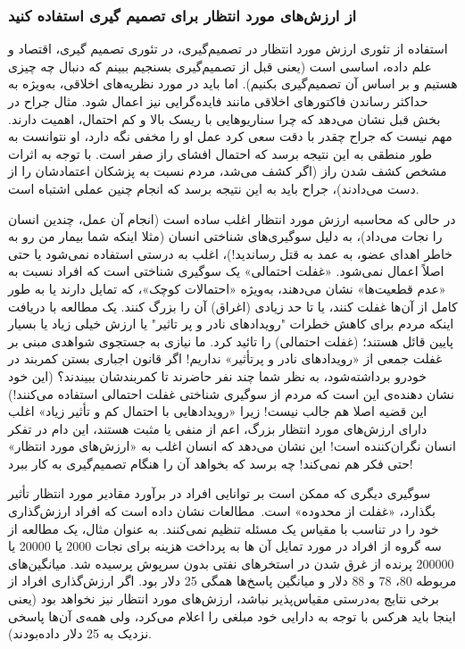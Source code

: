 \subsubsection*{از ارزش‌های مورد انتظار برای تصمیم گیری استفاده کنید}
\label{subsubsec:از ارزش‌های مورد انتظار برای تصمیم گیری استفاده کنید}
استفاده از تئوری ارزش مورد انتظار در تصمیم‌گیری، در تئوری تصمیم گیری، اقتصاد و علم داده، اساسی است (یعنی قبل از تصمیم‌گیری بسنجیم ببینم که دنبال چه چیزی هستیم و بر اساس آن تصمیم‌گیری بکنیم).
اما باید در مورد نظریه‌های اخلاقی، به‌ویژه به حداکثر رساندن فاکتورهای اخلاقی مانند فایده‌گرایی نیز اعمال شود.
مثال جراح در بخش قبل نشان می‌دهد که چرا سناریوهایی با ریسک بالا و کم احتمال، اهمیت دارند.
مهم نیست که جراح چقدر با دقت سعی کرد عمل او را مخفی نگه دارد، او نتوانست به طور منطقی به این نتیجه برسد که احتمال افشای راز صفر است.
با توجه به اثرات مشخص کشف شدن راز (اگر کشف می‌شد، مردم نسبت به پزشکان اعتمادشان را از دست می‌دادند)، جراح باید به این نتیجه برسد که انجام چنین عملی اشتباه است.

در حالی که محاسبه ارزش مورد انتظار اغلب ساده است (انجام آن عمل، چندین انسان را نجات می‌داد)، به دلیل سوگیری‌های شناختی انسان (مثلا اینکه شما بیمار من رو به خاطر اهدای عضو، به عمد به قتل رساندید!)، اغلب به درستی استفاده نمی‌شود یا حتی اصلاً اعمال نمی‌شود.
«غفلت احتمالی» یک سوگیری شناختی است که افراد نسبت به «عدم قطعیت‌ها» نشان می‌دهند، به‌ویژه «احتمالات کوچک»، که تمایل دارند یا به طور کامل از آن‌ها غفلت کنند، یا تا حد زیادی (اغراق) آن را بزرگ کنند.
یک مطالعه با دریافت اینکه مردم برای کاهش خطرات "رویدادهای نادر و پر تاثیر" یا ارزش خیلی زیاد یا بسیار پایین قائل هستند؛ (غفلت احتمالی) را تائید کرد.
ما نیازی به جستجوی شواهدی مبنی بر غفلت جمعی از «رویدادهای نادر و پرتأثیر» نداریم!
اگر قانون اجباری بستن کمربند در خودرو برداشته‌شود، به نظر شما چند نفر حاضرند تا کمربندشان ببیندند؟ (این خود نشان دهنده‌ی این است که مردم از سوگیری شناختی غفلت احتمالی استفاده می‌کنند!) این قضیه اصلا هم جالب نیست!
زیرا «رویدادهایی با احتمال کم و تأثیر زیاد» اغلب دارای ارزش‌های مورد انتظار بزرگ، اعم از منفی یا مثبت هستند، این دام در تفکر انسان نگران‌کننده است!
این نشان می‌دهد که انسان اغلب به «ارزش‌های مورد انتظار» حتی فکر هم نمی‌کند!
چه برسد که بخواهد آن را هنگام تصمیم‌گیری به کار ببرد!

سوگیری دیگری که ممکن است بر توانایی افراد در برآورد مقادیر مورد انتظار تأثیر بگذارد، «غفلت از محدوده» است.\     مطالعات نشان داده است که افراد ارزش‌گذاری خود را در تناسب با مقیاس یک مسئله تنظیم نمی‌کنند.
به عنوان مثال، یک مطالعه از سه گروه از افراد در مورد تمایل آن ها به پرداخت هزینه برای نجات 2000 یا 20000 یا 200000 پرنده از غرق شدن در استخرهای نفتی بدون سرپوش پرسیده شد.
میانگین‌های مربوطه 80، 78 و 88 دلار و میانگین پاسخ‌ها همگی 25 دلار بود.
اگر ارزش‌گذاری افراد از برخی نتایج به‌درستی مقیاس‌پذیر نباشد، ارزش‌های مورد انتظار نیز نخواهد بود (یعنی اینجا باید هرکس با توجه به دارایی خود مبلغی را اعلام می‌کرد، ولی همه‌ی آن‌ها پاسخی نزدیک به 25 دلار داده‌بودند).


